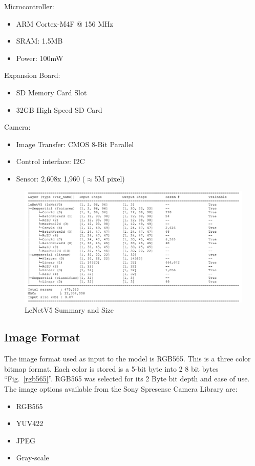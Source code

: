 \documentclass[conference]{IEEEtran}
\begin{document}
\break
Microcontroller:
\begin{itemize}
	\item ARM Cortex-M4F @ 156 MHz
	\item SRAM: 1.5MB
	\item Power: 100mW
\end{itemize} 
Expansion Board:
\begin{itemize}
	\item SD Memory Card Slot
	\item 32GB High Speed SD Card
\end{itemize} 
Camera:
\begin{itemize}
	\item Image Transfer: CMOS 8-Bit Parallel
	\item Control interface: I2C
	\item Sensor: 2,608x 1,960 ($\approx$5M pixel)
\end{itemize} 

\begin{figure}[htbp]
\centerline{\includegraphics[scale=.22]{leNetV5.png}}
\caption{LeNetV5 Summary and Size}
\label{lenet}
\end{figure}

\subsection{Image Format}\label{AA}
The image format used as input to the model is RGB565. This is a three color bitmap format. 
Each color is stored is a 5-bit byte into 2 8 bit bytes ``Fig.~\ref{rgb565}''. RGB565 was selected for its 2 Byte bit depth and ease of use.
The image options available from the Sony Spresense Camera Library are:
\begin{itemize}
	\item RGB565
	\item YUV422
	\item JPEG
	\item Gray-scale
\end{itemize} 
\end{document}
